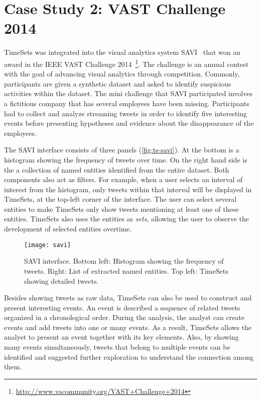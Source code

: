 \section{Case Study 2: VAST Challenge 2014}
TimeSets was integrated into the visual analytics system SAVI~\cite{Xu2014} that won an award in the IEEE VAST Challenge 2014~\footnote{\url{http://www.vacommunity.org/VAST+Challenge+2014}}. The challenge is an annual contest with the goal of advancing visual analytics through competition. Commonly, participants are given a synthetic dataset and asked to identify suspicious activities within the dataset. The mini challenge that SAVI participated involves a fictitious company that has several employees have been missing. Participants had to collect and analyze streaming tweets in order to identify five interesting events before presenting hypotheses and evidence about the disappearance of the employees.

The SAVI interface consists of three panels (\autoref{fig:ts-savi}). At the bottom is a histogram showing the frequency of tweets over time. On the right hand side is the a collection of named entities identified from the entire dataset. Both components also act as filters. For example, when a user selects an interval of interest from the histogram, only tweets within that interval will be displayed in TimeSets, at the top-left corner of the interface. The user can select several entities to make TimeSets only show tweets mentioning at least one of these entities. TimeSets also uses the entities as \emph{sets}, allowing the user to observe the development of selected entities overtime.

\begin{figure}[!htb]
	\centering
	\texttt{[image: savi]}
	\caption{SAVI interface. Bottom left: Histogram showing the frequency of tweets. Right: List of extracted named entities. Top left: TimeSets showing detailed tweets.}
	\label{fig:ts-savi}
\end{figure}

Besides showing tweets as raw data, TimeSets can also be used to construct and present interesting events. An event is described a sequence of related tweets organized in a chronological order. During the analysis, the analyst can create events and add tweets into one or many events. As a result, TimeSets allows the analyst to present an event together with its key elements. Also, by showing many events simultaneously, tweets that belong to multiple events can be identified and suggested further exploration to understand the connection among them.